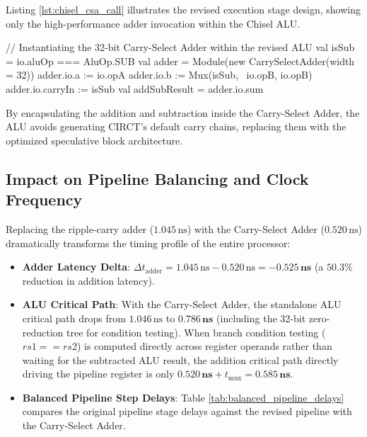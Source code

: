 Listing \ref{lst:chisel_csa_call} illustrates the revised execution stage design, showing only the high-performance adder invocation within the Chisel ALU.

\begin{chiselcode}[caption={Calling the high-performance Carry-Select Adder within the revised RISC-V ALU.},label={lst:chisel_csa_call}]
// Instantiating the 32-bit Carry-Select Adder within the revised ALU
val isSub = io.aluOp === AluOp.SUB
val adder = Module(new CarrySelectAdder(width = 32))
adder.io.a       := io.opA
adder.io.b       := Mux(isSub, ~io.opB, io.opB)
adder.io.carryIn := isSub
val addSubResult = adder.io.sum
\end{chiselcode}

By encapsulating the addition and subtraction inside the Carry-Select Adder, the ALU avoids generating CIRCT's default carry chains, replacing them with the optimized speculative block architecture.

\subsection{Impact on Pipeline Balancing and Clock Frequency}

Replacing the ripple-carry adder ($1.045\,\text{ns}$) with the Carry-Select Adder ($0.520\,\text{ns}$) dramatically transforms the timing profile of the entire processor:
\begin{itemize}
    \item \textbf{Adder Latency Delta}: $\Delta t_{\text{adder}} = 1.045\,\text{ns} - 0.520\,\text{ns} = \mathbf{-0.525\,\text{ns}}$ (a $50.3\%$ reduction in addition latency).
    \item \textbf{ALU Critical Path}: With the Carry-Select Adder, the standalone ALU critical path drops from $1.046\,\text{ns}$ to $\mathbf{0.786\,\text{ns}}$ (including the 32-bit zero-reduction tree for condition testing). When branch condition testing ($rs1 == rs2$) is computed directly across register operands rather than waiting for the subtracted ALU result, the addition critical path directly driving the pipeline register is only $\mathbf{0.520\,\text{ns}} + t_{\text{mux}} = \mathbf{0.585\,\text{ns}}$.
    \item \textbf{Balanced Pipeline Step Delays}:
    Table \ref{tab:balanced_pipeline_delays} compares the original pipeline stage delays against the revised pipeline with the Carry-Select Adder.
\end{itemize}

